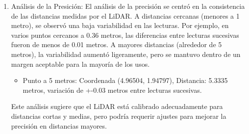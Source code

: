 \begin{enumerate}
            LiDAR con los elementos visuales capturados por la c\'amara, lo que es esencial para el 
            proceso de construcci\'on de una representaci\'on tridimensional coherente.
        \item An\'alisis de la Presici\'on: El an\'alisis de la precisi\'on se centr\'o en la 
            consistencia de las distancias medidas por el LiDAR. A distancias cercanas (menores a 1 metro), 
            se observ\'o una baja variabilidad en las lecturas. Por ejemplo, en varios puntos cercanos 
            a 0.36 metros, las diferencias entre lecturas sucesivas fueron de menos de 0.01 metros. 
            A mayores distancias (alrededor de 5 metros), la variabilidad aument\'o ligeramente, 
            pero se mantuvo dentro de un margen aceptable para la mayor\'ia de los usos.
            \begin{itemize}
                \item Punto a 5 metros: Coordenada (4.96504, 1.94797), Distancia: 5.3335 metros, variaci\'on de +-0.03 metros entre lecturas sucesivas.
            \end{itemize}
            Este an\'alisis sugiere que el LiDAR est\'a calibrado adecuadamente para distancias cortas y medias, 
                pero podr\'ia requerir ajustes para mejorar la precisi\'on en distancias mayores.
    \end{enumerate}

